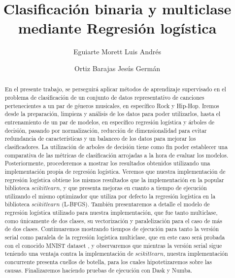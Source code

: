 \documentclass[runningheads]{llncs}
\begin{document}
%
\title{Clasificación binaria y multiclase mediante Regresión logística}
%
%
\author{Eguiarte Morett Luis Andrés \and Ortiz Barajas Jesús Germán}
%

%
%
\maketitle              %
%
\begin{abstract}
En el presente trabajo, se perseguirá aplicar métodos de aprendizaje supervisado en el problema de clasificación de un conjunto de datos representativo de canciones pertenecientes a un par de géneros musicales, en específico Rock y Hip-Hop. Iremos desde la preparación, limpieza y análisis de los datos para poder utilizarlos, hasta el entrenamiento de un par de modelos, en específico regresión logística y árboles de decisión, pasando por normalización, reducción de dimensionalidad para evitar redundancia de características y un balanceo de los datos para mejorar los clasificadores. La utilización de arboles de decisión tiene como fin poder establecer una comparativa de las métricas de clasificación arrojadas a la hora de evaluar los modelos. Posteriormente, procederemos a mostrar los resultados obtenidos utilizando una implementación propia de regresión logística. Veremos que nuestra implementación de regresión logística obtiene los mismos resultados que la implementación en la popular biblioteca $scikitlearn$, y que presenta mejoras en cuanto a tiempo de ejecución utilizando el mismo optimizador que utiliza por defecto la regresión logística en la biblioteca $scikitlearn$ (L-BFGS). También presentaremos a detalle el modelo de regresión logística utilizado para nuestra implementación, que fue tanto multiclase, como únicamente de dos clases, su vectorización y paralelización para el caso de más de dos clases. Continuaremos mostrando tiempos de ejecución para tanto la versión serial como paralela de la regresión logística multiclase, que en este caso será probada con el conocido MNIST dataset \cite{Dua:2019}, y observaremos que mientras la versión serial sigue teniendo una ventaja contra la implementación de $scikitlearn$, nuestra implementación concurrente presenta cuellos de botella, para los cuales hipotetizaremos sobre las causas. Finalizaremos haciendo pruebas de ejecución con Dask y Numba.

\end{abstract}
\end{document}
